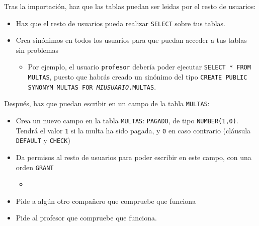\begin{homeworkProblem}
  Tras la importación, haz que las tablas puedan ser leidas por el resto de usuarios:
  \begin{itemize}
  \item Haz que el resto de usuarios pueda realizar \texttt{SELECT} sobre tus tablas.  
  \item Crea sinónimos en todos los usuarios para que puedan acceder a tus tablas sin problemas
    \begin{itemize}
    \item Por ejemplo, el usuario \texttt{profesor} debería poder ejecutar \texttt{SELECT * FROM MULTAS}, puesto que habrás creado un sinónimo del tipo \texttt{CREATE PUBLIC SYNONYM MULTAS FOR \textit{MIUSUARIO}.MULTAS}.
    \end{itemize}
  \end{itemize}

  Después, haz que puedan escribir en un campo de la tabla \texttt{MULTAS}:
  \begin{itemize}
  \item Crea un nuevo campo en la tabla \texttt{MULTAS}: \texttt{PAGADO}, de tipo \texttt{NUMBER(1,0)}. Tendrá el valor \texttt{1} si la multa ha sido pagada, y \texttt{0} en caso contrario (cláusula \texttt{DEFAULT} y \texttt{CHECK})
    
  \item Da permisos al resto de usuarios para poder escribir en este campo, con una orden \texttt{GRANT}
    \begin{itemize}
    \item {}
    \end{itemize}

  \item Pide a algún otro compañero que compruebe que funciona
  \item Pide al profesor que compruebe que funciona.

  \end{itemize}
  

\end{homeworkProblem}



